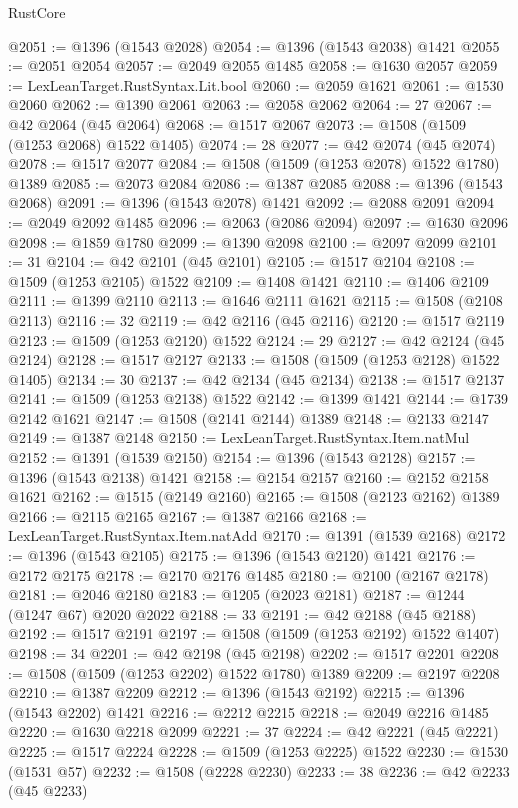 \begin{lexlean}{RustCore}
\begin{coremodule}
@2051 := @1396 (@1543 @2028)
@2054 := @1396 (@1543 @2038) @1421
@2055 := @2051 @2054
@2057 := @2049 @2055 @1485
@2058 := @1630 @2057
@2059 := LexLeanTarget.RustSyntax.Lit.bool
@2060 := @2059 @1621
@2061 := @1530 @2060
@2062 := @1390 @2061
@2063 := @2058 @2062
@2064 := 27
@2067 := @42 @2064 (@45 @2064)
@2068 := @1517 @2067
@2073 := @1508 (@1509 (@1253 @2068) @1522 @1405)
@2074 := 28
@2077 := @42 @2074 (@45 @2074)
@2078 := @1517 @2077
@2084 := @1508 (@1509 (@1253 @2078) @1522 @1780) @1389
@2085 := @2073 @2084
@2086 := @1387 @2085
@2088 := @1396 (@1543 @2068)
@2091 := @1396 (@1543 @2078) @1421
@2092 := @2088 @2091
@2094 := @2049 @2092 @1485
@2096 := @2063 (@2086 @2094)
@2097 := @1630 @2096
@2098 := @1859 @1780
@2099 := @1390 @2098
@2100 := @2097 @2099
@2101 := 31
@2104 := @42 @2101 (@45 @2101)
@2105 := @1517 @2104
@2108 := @1509 (@1253 @2105) @1522
@2109 := @1408 @1421
@2110 := @1406 @2109
@2111 := @1399 @2110
@2113 := @1646 @2111 @1621
@2115 := @1508 (@2108 @2113)
@2116 := 32
@2119 := @42 @2116 (@45 @2116)
@2120 := @1517 @2119
@2123 := @1509 (@1253 @2120) @1522
@2124 := 29
@2127 := @42 @2124 (@45 @2124)
@2128 := @1517 @2127
@2133 := @1508 (@1509 (@1253 @2128) @1522 @1405)
@2134 := 30
@2137 := @42 @2134 (@45 @2134)
@2138 := @1517 @2137
@2141 := @1509 (@1253 @2138) @1522
@2142 := @1399 @1421
@2144 := @1739 @2142 @1621
@2147 := @1508 (@2141 @2144) @1389
@2148 := @2133 @2147
@2149 := @1387 @2148
@2150 := LexLeanTarget.RustSyntax.Item.natMul
@2152 := @1391 (@1539 @2150)
@2154 := @1396 (@1543 @2128)
@2157 := @1396 (@1543 @2138) @1421
@2158 := @2154 @2157
@2160 := @2152 @2158 @1621
@2162 := @1515 (@2149 @2160)
@2165 := @1508 (@2123 @2162) @1389
@2166 := @2115 @2165
@2167 := @1387 @2166
@2168 := LexLeanTarget.RustSyntax.Item.natAdd
@2170 := @1391 (@1539 @2168)
@2172 := @1396 (@1543 @2105)
@2175 := @1396 (@1543 @2120) @1421
@2176 := @2172 @2175
@2178 := @2170 @2176 @1485
@2180 := @2100 (@2167 @2178)
@2181 := @2046 @2180
@2183 := @1205 (@2023 @2181)
@2187 := @1244 (@1247 @67) @2020 @2022
@2188 := 33
@2191 := @42 @2188 (@45 @2188)
@2192 := @1517 @2191
@2197 := @1508 (@1509 (@1253 @2192) @1522 @1407)
@2198 := 34
@2201 := @42 @2198 (@45 @2198)
@2202 := @1517 @2201
@2208 := @1508 (@1509 (@1253 @2202) @1522 @1780) @1389
@2209 := @2197 @2208
@2210 := @1387 @2209
@2212 := @1396 (@1543 @2192)
@2215 := @1396 (@1543 @2202) @1421
@2216 := @2212 @2215
@2218 := @2049 @2216 @1485
@2220 := @1630 @2218 @2099
@2221 := 37
@2224 := @42 @2221 (@45 @2221)
@2225 := @1517 @2224
@2228 := @1509 (@1253 @2225) @1522
@2230 := @1530 (@1531 @57)
@2232 := @1508 (@2228 @2230)
@2233 := 38
@2236 := @42 @2233 (@45 @2233)

\end{coremodule}
\end{lexlean}
